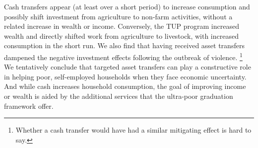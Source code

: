 \documentclass[12pt,article]{article}
\begin{document}
Cash transfers appear (at least over a short period) to increase consumption and
possibly shift investment from agriculture to non-farm activities, without a related
increase in wealth or income. Conversely, the TUP program increased wealth and
directly shifted work from agriculture to livestock, with increased consumption in
the short run. We also find that having received asset transfers dampened the
negative investment effects following the outbreak of violence. \footnote{Whether a cash
transfer would have had a similar mitigating effect is hard to say.} We tentatively
conclude that targeted asset transfers can play a constructive role in helping poor,
self-employed households when they face economic uncertainty. And while cash
increases household consumption, the goal of improving income or wealth is aided by
the additional services that the ultra-poor graduation framework offer.
\end{document}
